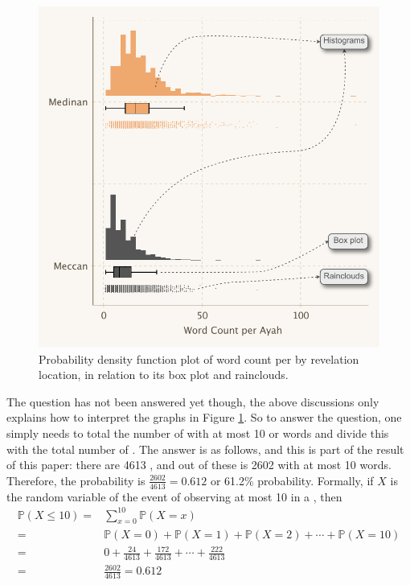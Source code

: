 \begin{exmpx}
\begin{figure}[!t]
    \includegraphics[width=\textwidth]{img/plot3.pdf}
    \caption{Probability density function plot of word count per   by revelation location, in relation to its box plot and rainclouds.}
    \label{fig:meccan_medinan_word_count_per_ayah}
\end{figure}

The question has not been answered yet though, the above discussions only explains how to interpret the graphs in Figure \ref{fig:meccan_medinan_word_count_per_ayah}. So to answer the question, one simply needs to total the number of   with at most 10   or words and divide this with the total number of  . The answer is as follows, and this is part of the result of this paper: there are 4613  , and out of these is 2602   with at most 10 words. Therefore, the probability is $\frac{2602}{4613}=0.612$ or 61.2\% probability. Formally, if $X$ is the random variable of the event of observing at most 10   in a  , then 
\begin{align}
    \mathbb{P}(X\leq 10)=&\sum_{x=0}^{10}\mathbb{P}(X=x)\label{ex_eq:prob_lesseq_10}\\
    =&\mathbb{P}(X=0)+\mathbb{P}(X=1)+\mathbb{P}(X=2)+\cdots+\mathbb{P}(X=10)\label{ex_eq:freq_dist_prob1..10}\\
    =&0+\frac{24}{4613}+\frac{172}{4613}+\cdots+\frac{222}{4613}\label{ex_eq:freq_dist_probval1..10}\\
    =&\frac{2602}{4613}=0.612\label{ex_eq:prob_0612}
\end{align}


\end{exmpx}
